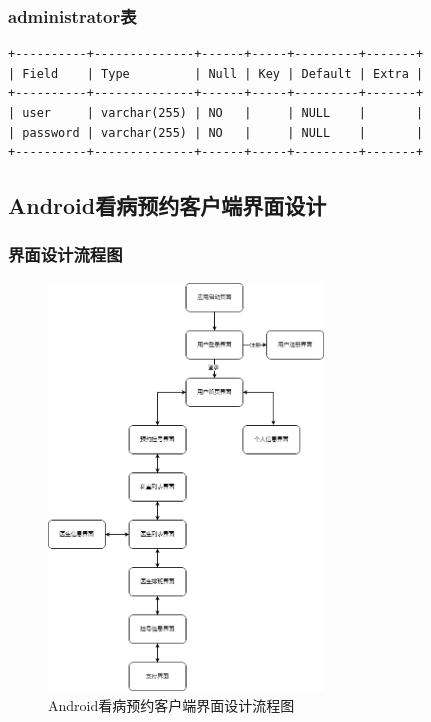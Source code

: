 \documentclass[UTF8,12pt]{article}
\begin{document}
\subsubsection{administrator表}
\begin{lstlisting}[frame=shadowbox]
+----------+--------------+------+-----+---------+-------+
| Field    | Type         | Null | Key | Default | Extra |
+----------+--------------+------+-----+---------+-------+
| user     | varchar(255) | NO   |     | NULL    |       |
| password | varchar(255) | NO   |     | NULL    |       |
+----------+--------------+------+-----+---------+-------+
\end{lstlisting}

\newpage

\subsection{Android看病预约客户端界面设计}
\subsubsection{界面设计流程图}
\begin{figure}[htbp]
    \centering
    \includegraphics[width=0.65\textwidth]{imgs/3.png}
    \caption{Android看病预约客户端界面设计流程图}
\end{figure}
\end{document}
